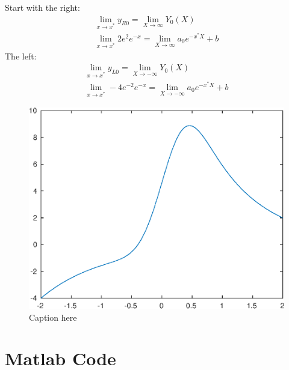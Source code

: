 \documentclass{/home/janmebows/Documents/LatexTemplates/myassignment}
\begin{document}
\begin{enumerate}
	Start with the right:
	\begin{align*}
		\lim_{x\to x^*} y_{R0}=\lim_{X\to \infty} Y_0(X)\\
		\lim_{x\to x^*} 2e^2e^{-x}  = \lim_{X\to \infty} a_0 e^{-x^* X} +b
	\end{align*}
	The left:
	\begin{align*}
		\lim_{x\to x^*} y_{L0}=\lim_{X\to -\infty} Y_0(X) \\
		\lim_{x\to x^*} -4e^{-2}e^{-x} = \lim_{X\to -\infty} a_0 e^{-x^* X} +b
	\end{align*}


	\begin{figure}[tb]
		\centering
		\includegraphics{TopicCA3Q2}
		\caption{Caption here}
		\label{fig:q2}
	\end{figure}
\end{enumerate}
\section*{Matlab Code}


\clearpage

\end{document}
